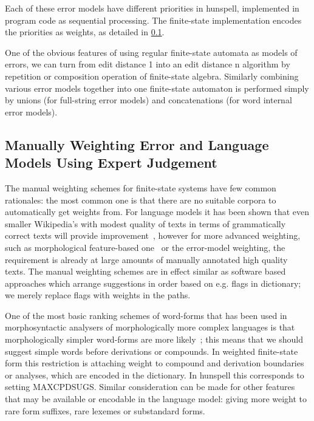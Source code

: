 \documentclass[a4paper,12pt]{article}
\begin{document}
Each of these error models have different priorities in hunspell, implemented
in program code as sequential processing. The finite-state implementation
encodes the priorities as weights, as detailed in
\ref{subsec:manual-weighting}.

One of the obvious features of using regular finite-state automata as models of
errors, we can turn from edit distance 1 into an edit distance n algorithm by
repetition or composition operation of finite-state
algebra\cite{pirinen2012effects}.  Similarly combining various error models
together into one finite-state automaton is performed simply by unions (for
full-string error models) and
concatenations (for word internal error models).

\subsection{Manually Weighting Error and Language Models Using Expert
Judgement}
\label{subsec:manual-weighting}

The manual weighting schemes for finite-state systems have few common
rationales: the most common one is that there are no suitable corpora to
automatically get weights from. For language models it has been shown that even
smaller Wikipedia's with modest quality of texts in terms of grammatically
correct texts will provide improvement~\cite{pirinen/2010/lrec}, however for
more advanced weighting, such as morphological feature-based
one~\cite{pirinen2012improving} or the error-model weighting, the requirement
is already at large amounts of manually annotated high quality texts. The
manual weighting schemes are in effect similar as software based approaches
which arrange suggestions in order based on e.g. flags in dictionary; we
merely replace flags with weights in the paths.

One of the most basic ranking schemes of word-forms that has been used in
morphosyntactic analysers of morphologically more complex languages is that
morphologically simpler word-forms are more
likely~\cite{karlsson1992swetwol}; this means that we should suggest simple
words before derivations or compounds. In weighted finite-state form this
restriction is attaching weight to compound and derivation boundaries or
analyses, which are encoded in the dictionary. In hunspell this corresponds to
setting MAXCPDSUGS. Similar consideration can be made for other features that
may be available or encodable in the language model: giving more weight to
rare form suffixes, rare lexemes or substandard forms.
\end{document}
